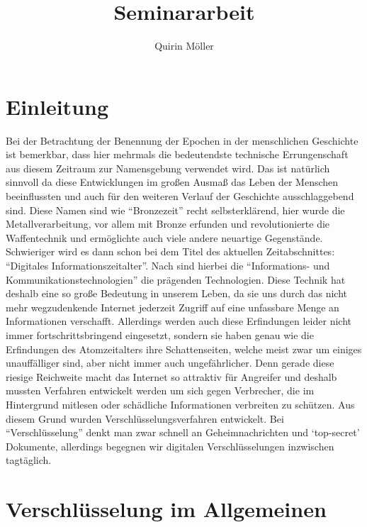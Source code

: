 \documentclass{scrarticle} %
\title{Seminararbeit}
\author{Quirin Möller}
\begin{document}
    \maketitle
    \newpage
    \tableofcontents
    \newpage

    \section{Einleitung}
    Bei der Betrachtung der Benennung der Epochen in der menschlichen Geschichte ist bemerkbar, dass hier mehrmals die bedeutendste technische Errungenschaft aus diesem Zeitraum zur Namensgebung verwendet wird. Das ist natürlich sinnvoll da diese Entwicklungen im großen Ausmaß das Leben der Menschen beeinflussten und auch für den weiteren Verlauf der Geschichte ausschlaggebend sind. Diese Namen sind  wie \enquote{Bronzezeit} recht selbsterklärend, hier wurde die Metallverarbeitung, vor allem mit Bronze erfunden und revolutionierte die Waffentechnik und ermöglichte auch viele andere neuartige Gegenstände.\autocite{BronzezeitEuropaDeutschland} 
    Schwieriger wird es dann schon bei dem Titel des aktuellen Zeitabschnittes: \enquote{Digitales Informationszeitalter}. Nach  sind hierbei die \enquote{Informations- und Kommunikationstechnologien} die prägenden Technologien.\autocite{jornlengsfeld}
    Diese Technik hat deshalb eine so große Bedeutung in unserem Leben, da sie uns durch das nicht mehr wegzudenkende Internet jederzeit Zugriff auf eine unfassbare Menge an Informationen verschafft. Allerdings werden auch diese Erfindungen leider nicht immer fortschrittsbringend eingesetzt, sondern sie haben genau wie die Erfindungen des Atomzeitalters ihre Schattenseiten, welche meist zwar um einiges unauffälliger sind, aber nicht immer auch ungefährlicher. Denn gerade diese riesige Reichweite macht das Internet so attraktiv für Angreifer und deshalb mussten Verfahren entwickelt werden um sich gegen Verbrecher, die im Hintergrund mitlesen oder schädliche Informationen verbreiten zu schützen. Aus diesem Grund wurden Verschlüsselungsverfahren entwickelt. Bei \enquote{Verschlüsselung} denkt man zwar schnell an Geheimnachrichten und \enquote*{top-secret} Dokumente, allerdings begegnen wir digitalen Verschlüsselungen inzwischen tagtäglich.

    \section[Verschlüsselung allgemein]{Verschlüsselung im Allgemeinen}
\end{document}
